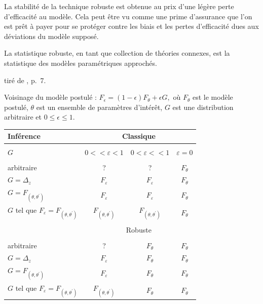 \documentclass{BeamerTemplate}
\begin{document}
\begin{refsection}
\begin{frame}{}
La {\color{blue}stabilité} de la technique robuste est obtenue au prix d'une légère perte d'{\color{blue}efficacité} au modèle. Cela peut être vu comme une prime d'assurance que l'on est prêt à payer pour se protéger contre les biais et les pertes d'efficacité dues aux déviations du modèle supposé.

\begin{center}
{\LARGE{\color{blue}La statistique robuste, en tant que collection de théories connexes, est la statistique des modèles paramétriques approchés.}}
\end{center}

\bigskip

tiré de , p.~7.
\end{frame}

\begin{frame}{}
{\color{blue}Voisinage du modèle postulé} :
$F_{\epsilon} = (1-\epsilon) F_{\theta} + \epsilon G,$
où $F_{\theta}$ est le modèle postulé, $\theta$ est un ensemble de paramètres d'intérêt, $G$ est une distribution arbitraire et $0\leq \epsilon \leq 1$.

\begin{table}[h]
{\scriptsize\begin{tabular}{lccc}
 Inférence & \multicolumn{3}{c}{Classique} \\ \hline\\
 $G$ &
$0<<\varepsilon <1$ & $0<\varepsilon <<1$ & $\varepsilon =0$ \\
\hline \\
arbitraire & ? & ? & $F_{\theta }$ \\
$G=\Delta _{z}$ & $F_{\varepsilon }$ & $F_{\varepsilon }$ & $F_{\theta }$ \\
$G=F_{(\theta ,\theta ^{\prime })}$ & $F_{\varepsilon }$ &
$F_{\varepsilon }$
& $F_{\theta }$ \\
$G$ tel que $F_{\varepsilon }=F_{(\theta ,\theta ^{\prime })}$ & $%
F_{(\theta ,\theta ^{\prime })}$ & $F_{(\theta ,\theta ^{\prime })}$ & $%
F_{\theta }$ \\ \hline\\
 & \multicolumn{3}{c}{Robuste} \\ 
\hline \\
arbitraire & ? & $F_{\theta }$ & $F_{\theta }$ \\
$G=\Delta _{z}$ & $F_{\varepsilon }$ & $F_{\theta }$ & $F_{\theta }$ \\
$G=F_{(\theta ,\theta ^{\prime })}$ & $F_{\varepsilon }$ & $F_{\theta }$ & $%
F_{\theta }$ \\
$G$ tel que $F_{\varepsilon }=F_{(\theta ,\theta ^{\prime })}$ & $%
F_{(\theta ,\theta ^{\prime })}$ & $F_{\theta }$ & $F_{\theta }$ \\
\hline
\end{tabular}}
\end{table}


\end{frame}
\end{refsection}
\end{document}
